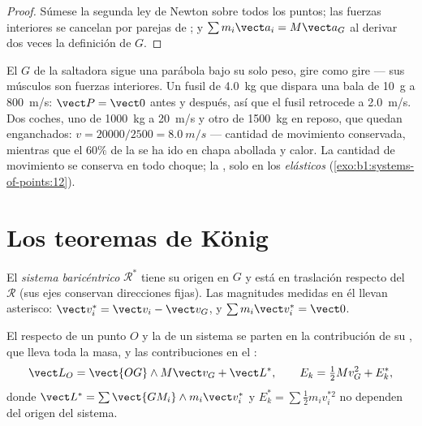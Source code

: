 \begin{proof}
Súmese la segunda ley de Newton sobre todos los puntos; las fuerzas
interiores se cancelan por parejas de ; y
$\sum m_i\vect a_i = M\vect a_G$ al derivar dos veces la definición de $G$.
\end{proof}

\begin{example}\label{ex:b1:systems-of-points:cm}
El $G$ de la saltadora sigue una parábola bajo su solo peso, gire como
gire --- sus músculos son fuerzas interiores. Un fusil de \qty{4.0}{kg}
que dispara una bala de \qty{10}{g} a \qty{800}{m/s}: $\vect P = \vect 0$
antes y después, así que el fusil retrocede a \qty{2.0}{m/s}. Dos coches,
uno de \qty{1000}{kg} a \qty{20}{m/s} y otro de \qty{1500}{kg} en reposo,
que quedan enganchados: $v =
20000/2500 = \qty{8.0}{m/s}$ --- cantidad de movimiento conservada,
mientras que el $60\%$ de la  se ha ido en chapa abollada
y calor. La cantidad de movimiento se conserva en todo choque; la , solo en los \emph{elásticos}
(\cref{exo:b1:systems-of-points:12}).
\end{example}

\section{Los teoremas de König}

\begin{definition}\label{def:b1:systems-of-points:barycentric}
El \emph{sistema baricéntrico} $\mathcal R^*$ tiene su origen en $G$ y está
en traslación respecto del  $\mathcal R$ (sus ejes conservan
direcciones fijas). Las magnitudes medidas en él llevan asterisco: $\vect v_i^*
= \vect v_i - \vect v_G$, y $\sum m_i\vect v_i^* = \vect 0$.
\end{definition}

\begin{theorem}\label{thm:b1:systems-of-points:koenig}
El  respecto de un punto $O$ y la  de un
sistema se parten en la contribución de su , que lleva toda
la masa, y las contribuciones en el :
\[
\vect L_O = \vect{OG}\wedge M\vect v_G + \vect L^*, \qquad
E_k = \tfrac12 Mv_G^2 + E_k^*,
\]
donde $\vect L^* = \sum\vect{GM_i}\wedge m_i\vect v_i^*$ y $E_k^* = \sum\tfrac12
m_iv_i^{*2}$ no dependen del origen del sistema.
\end{theorem}

